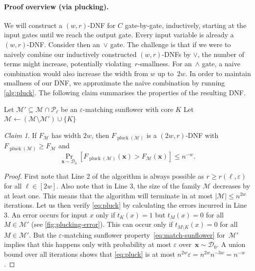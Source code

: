 \documentclass[11pt]{article}
\theoremstyle{plain}
\theoremstyle{definition}
\theoremstyle{remark}
\newtheorem{claim}{Claim}
\newcommand{\eps}{\varepsilon}
\DeclareMathOperator{\pluck}{pluck}
\def\cald{{\mathcal D}}
\def\calm{{\mathcal M}}
\def\calp{{\mathcal P}}
\begin{document}
\paragraph{Proof overview (via plucking).}
We will construct a $(w,r)$-DNF for $C$
gate-by-gate, inductively, starting at the input gates until we reach the
output gate.
Every input variable is already a~$(w,r)$-DNF.
Consider then an~$\lor$ gate. The challenge is that if we were to naively
combine our inductively constructed $(w,r)$-DNFs by $\lor$, the number of
terms might increase, potentially violating~$r$-smallness. For an~$\land$
gate, a naive combination would also increase the width from $w$ up to~$2w$. In order to maintain smallness of our DNF, we approximate the naive
combination 
by running
\cref{alg:pluck}. The following claim
summarises the properties of the resulting DNF.

\begin{algorithm}[H]
    \caption{Plucking procedure $\pluck(\calm)$}
        \label{alg:pluck}
    \begin{algorithmic}[1]
        \While{$\exists \ell\in [2w]\colon |\calm \cap \calp_\ell| > r^\ell$}
            \State
            Let $\calm' \subseteq \calm \cap \calp_\ell$ be an $\eps$-matching sunflower with core $K$
            \State
            Let
            $\calm \leftarrow (\calm \setminus \calm')\cup \{K\}$
        \EndWhile
    \end{algorithmic}
\end{algorithm}
\begin{claim}
    \label{claim:pluck}
    If $F_{\calm}$ has width $2w$, then
    $F_{\pluck(\calm)}$ is 
    a $(2w,r)$-DNF with $F_{\pluck(\calm)} \geq F_{\calm}$
    and
    \begin{equation}
    \label{eq:pluck}        
    \Pr_{\bm x \sim \cald_0}[F_{\pluck(\calm)}(\bm x) > F_{\calm}(\bm x)]
        \leq
        n^{-w}.
    \end{equation}
\end{claim}
\begin{proof}
First note that Line 2 of the algorithm is always possible as $r \geq
r(\ell,\eps)$ for all $\ell\in[2w]$. Also note that in Line 3, the size of
the family $\calm$ decreases by at least one. This means that the algorithm will
terminate in at most $|\calm|\leq n^{2w}$ iterations. Let us then verify
\eqref{eq:pluck} by calculating the errors incurred in Line 3. An error
occurs for input $x$ only if $t_K(x)=1$ but $t_M(x)=0$ for all~$M\in\calm'$ (see
\cref{fig:plucking-error}). This can occur only if $t_{M\setminus K}(x)=0$
for all $M\in\calm'$. But the $\eps$-matching sunflower
property~\eqref{eq:match-sunflower} for~$\calm'$ implies that this happens
only with probability at most $\eps$ over~$\bm x\sim\cald_0$. A union bound
over all iterations shows that \eqref{eq:pluck} is at most $n^{2w}\eps=n^{2w}n^{-3w}=n^{-w}$.
\end{proof}
\end{document}
